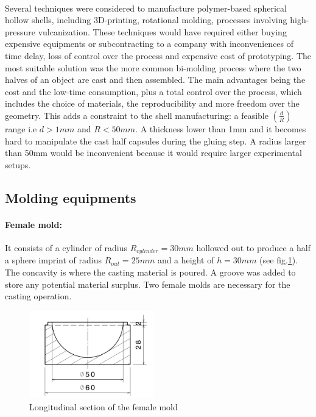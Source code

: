 \paragraph{}
Several techniques were considered to manufacture polymer-based spherical hollow shells, including 3D-printing, rotational molding, processes involving high-pressure vulcanization. These techniques would have required either buying expensive equipments or subcontracting to a company with inconveniences of time delay, loss of control over the process and expensive cost of prototyping. 
The most suitable solution was the more common bi-molding process where the two halves of an object are cast and then assembled. The main advantages being the cost and the low-time consumption, plus a total control over the process, which includes the choice of materials, the reproducibility and more freedom over the geometry.
This adds a constraint to the shell manufacturing: a feasible $(\frac{d}{R})$ range i.e $d > 1 mm$ and $R < 50 mm$. A thickness lower than 1mm and it becomes hard to manipulate the cast half capsules during the gluing step. A radius larger than 50mm would be inconvenient because it would require larger experimental setups.
\subsection{Molding equipments}

\paragraph{Female mold:}
It consists of a cylinder of radius $R_{cylinder}=30 mm$  hollowed out to produce a half a sphere imprint of radius $R_{out}=25 mm$ and a height of $h = 30 mm$ (see fig.\ref{fig:female_mold}). The concavity is where the casting material is poured.
A groove was added to store any potential material surplus. Two female molds are necessary for the casting operation.
\begin{figure}[H] %
	\centering%
		\includegraphics[width=0.48\textwidth]{figures/Chapter_1/female_mold.jpg}%
		\caption{Longitudinal section of the female mold}%
		\label{fig:female_mold}%
\end{figure}


